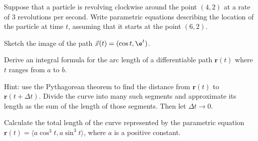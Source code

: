 \documentclass{watsonbook}
\begin{document}
\begin{aexercise}
  Suppose that a particle is revolving clockwise around the point
  $(4,2)$ at a rate of 3 revolutions per second. Write parametric
  equations describing the location of the particle at time $t$,
  assuming that it starts at the point $(6,2)$.
\end{aexercise}

\begin{aexercise}
  Sketch the image of the path $\vec{x}(t)=(\cos t, \e^t)$.
\end{aexercise}

\begin{aexercise}
  Derive an integral formula for the arc length of a differentiable
  path $\mathbf{r}(t)$ where $t$ ranges from $a$ to $b$.

  Hint: use the Pythagorean theorem to find the distance from
  $\mathbf{r}(t)$ to $\mathbf{r}(t+\Delta t)$. Divide the curve into
  many such segments and approximate its length as the sum of the
  length of those segments. Then let $\Delta t \to 0$. 
\end{aexercise}

\begin{aexercise}
  Calculate the total length of the curve represented by the
  parametric equation $\mathbf{r}(t) = \langle a\cos^3t, a\sin^3 t \rangle$,
  where $a$ is a positive constant.
\end{aexercise}
\end{document}
